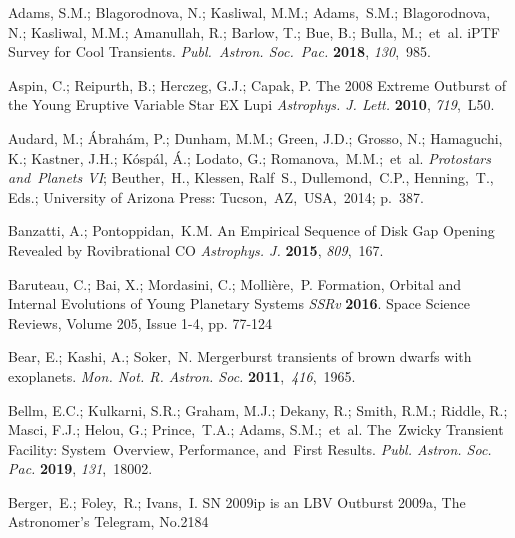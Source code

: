 \documentclass[galaxies,article,accept,moreauthors,pdftex]{mdpi}
\makeatletter
\let\jnl@style=\rmfamily
\def\ref@jnl#1{{\jnl@style#1}}%
\newcommand\apj{\ref@jnl{Astrophys. J.}}%
\newcommand\apjl{\ref@jnl{Astrophys. J. Lett.}}     %
\newcommand\ssr{\ref@jnl{SSRv}}%
\makeatother
\begin{document}
\begin{thebibliography}{999}


Adams, S.M.; Blagorodnova, N.; Kasliwal, M.M.; Adams,~S.M.; Blagorodnova, N.; Kasliwal, M.M.; Amanullah, R.; Barlow, T.; Bue, B.; Bulla, M.;~et~al.  iPTF Survey for Cool Transients. {\em Publ.~Astron. Soc.~Pac.} \textbf{2018}, {\em 130},~985. 



 Aspin, C.; Reipurth, B.; Herczeg, G.J.; Capak, P. 
The 2008 Extreme Outburst of the Young Eruptive Variable Star EX Lupi
{\em \apjl}  {\bf 2010}, {\em 719},~L50.

 Audard, M.; {\'A}brah{\'a}m, P.; Dunham, M.M.; Green, J.D.; Grosso, N.; Hamaguchi, K.; Kastner, J.H.; K{\'o}sp{\'a}l, {\'A}.; Lodato, G.; Romanova,~M.M.;~et~al.  {\em Protostars and~Planets VI}; Beuther,~H., Klessen, Ralf~S., Dullemond,~C.P., Henning,~T., Eds.; University of Arizona Press: Tucson,~AZ,~USA,~2014; p.~387.


 Banzatti, A.; Pontoppidan,~K.M. An Empirical Sequence of Disk Gap Opening Revealed by Rovibrational CO {\em \apj} \textbf{2015}, {\em 809},~167.

 Baruteau, C.; Bai, X.; Mordasini, C.; Molli{\`e}re,~P. Formation, Orbital and Internal Evolutions of Young Planetary Systems {\em \ssr} \textbf{2016}.
Space Science Reviews, Volume 205, Issue 1-4, pp. 77-124



 Bear, E.; Kashi, A.; Soker,~N.  Mergerburst transients of brown dwarfs with exoplanets. \emph{Mon. Not.  R. Astron. Soc.} \textbf{2011},~{\em 416},~1965.


Bellm, E.C.; Kulkarni, S.R.; Graham, M.J.; Dekany, R.; Smith, R.M.; Riddle, R.; Masci, F.J.; Helou, G.; Prince,~T.A.; Adams, S.M.;~et~al. The~Zwicky Transient Facility: System~Overview, Performance, and~First Results. {\em Publ. Astron. Soc. Pac.} \textbf{2019}, {\em 131},~18002.


 Berger,~E.; Foley,~R.; Ivans,~I.  SN 2009ip is an LBV Outburst 2009a, The Astronomer's Telegram, No.2184 
 


\end{thebibliography}
\end{document}
